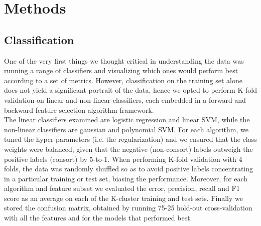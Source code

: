 \documentclass[twoside,twocolumn,paper=letter,fontsize=11pt]{article}
\begin{document}


\section{Methods}


\subsection{Classification}
One of the very first things we thought critical in understanding the data was running a range of classifiers and visualizing which ones would perform best according to a set of metrics. However, classification on the training set alone does not yield a significant portrait of the data, hence we opted to perform K-fold validation 
on linear and non-linear classifiers, each embedded in a forward and backward feature selection algorithm framework.\\

The linear classifiers examined are logistic regression and linear SVM, while the non-linear classifiers are gaussian and polynomial SVM. For each algorithm, we tuned the hyper-parameters (i.e. the regularization) and we ensured that the class weights were balanced, given that the negative (non-consort) labels outweigh the positive labels (consort) by 5-to-1. When performing K-fold validation with 4 folds, the data was randomly shuffled so as to avoid positive labels concentrating in a particular training or test set, biasing the performance. Moreover, for each algorithm and feature subset we evaluated the error, precision, recall and F1 score as an average on each of the K-cluster training and test sets. Finally we stored the confusion matrix, obtained by running 75-25 hold-out cross-validation with all the features and for the models that performed best.
\end{document}
